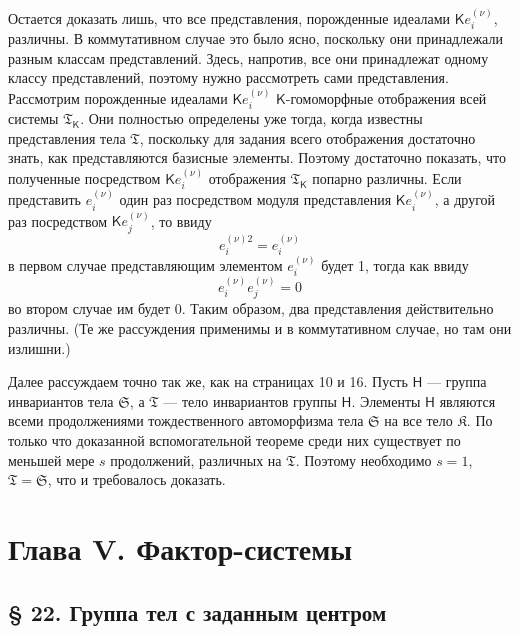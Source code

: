 \documentclass[11pt]{article}
\begin{document}
Остается доказать лишь, что все представления, порожденные идеалами \(\mathsf K e_i^{(\nu)}\), различны. В коммутативном случае это было ясно, поскольку они принадлежали разным классам представлений. Здесь, напротив, все они принадлежат одному классу представлений, поэтому нужно рассмотреть сами представления. Рассмотрим порожденные идеалами \(\mathsf K e_i^{(\nu)}\) \(\mathsf{K}\)-гомоморфные отображения всей системы \(\mathfrak T_{\mathsf{K}}\). Они полностью определены уже тогда, когда известны представления тела \(\mathfrak T\), поскольку для задания всего отображения достаточно знать, как представляются базисные элементы. Поэтому достаточно показать, что полученные посредством \(\mathsf K e_i^{(\nu)}\) отображения \(\mathfrak T_{\mathsf{K}}\) попарно различны. Если представить \(e_i^{(\nu)}\) один раз посредством модуля представления \(\mathsf K e_i^{(\nu)}\), а другой раз посредством \(\mathsf K e_j^{(\nu)}\), то ввиду
\[
e_i^{(\nu)2}=e_i^{(\nu)}
\]
в первом случае представляющим элементом \(e_i^{(\nu)}\) будет 1, тогда как ввиду
\[
e_i^{(\nu)}e_j^{(\nu)}=0
\]
во втором случае им будет 0. Таким образом, два представления действительно различны. (Те же рассуждения применимы и в коммутативном случае, но там они излишни.)

Далее рассуждаем точно так же, как на страницах 10 и 16. Пусть \(\mathsf{H}\) --- группа инвариантов тела \(\mathfrak S\), а \(\mathfrak T\) --- тело инвариантов группы \(\mathsf{H}\). Элементы \(\mathsf{H}\) являются всеми продолжениями тождественного автоморфизма тела \(\mathfrak S\) на все тело \(\mathfrak K\). По только что доказанной вспомогательной теореме среди них существует по меньшей мере \(s\) продолжений, различных на \(\mathfrak T\). Поэтому необходимо \(s=1\), \(\mathfrak T=\mathfrak S\), что и требовалось доказать.

\section*{Глава V. Фактор-системы}\label{kapitel-v.-faktorensysteme}

\subsection*{§ 22. Группа тел с заданным центром}\label{die-gruppe-der-koerper-mit-gegebenem-zentrum}
\end{document}
